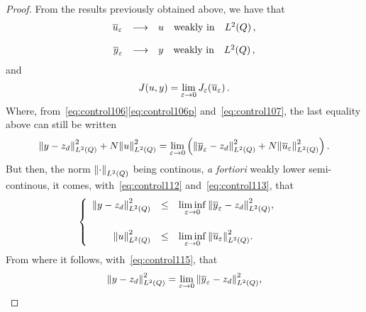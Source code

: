 \begin{proof}%
    From the results previously obtained above, we have that
    \begin{equation}\label{eq:control112}
        \begin{array}{rclll}
            {\overline{u}}_{\varepsilon} & \longrightarrow & u & \text{weakly in} & L^{2}\!\left({Q}\right),
        \end{array}
    \end{equation}

    \begin{equation}\label{eq:control113}
        \begin{array}{rcllll}
            {\overline{y}}_{\varepsilon} & \longrightarrow & y & \text{weakly in} & L^{2}\!\left({Q}\right),
        \end{array}
    \end{equation}
    and
    \begin{equation*}
        J(u,y) = \lim_{\varepsilon\to 0}J_{\varepsilon}\!\left({{\overline{u}}_{\varepsilon}}\right).
    \end{equation*}
    Where, from~\eqref{eq:control106}\eqref{eq:control106p}
    and~\eqref{eq:control107}, the last equality above can still be written
    \begin{equation}\label{eq:control115}
        \normecq{y - z_{d}} + N\normecq{u} = \lim_{\veps\to 0}\left({%
            \normecq{\bareps{y} - z_{d}} + N\normecq{\bareps{u}}
        }\right).
    \end{equation}
    But then, the norm ${\left\|{\cdot }\right\|}_{L^{2}\left({Q}\right)}$ being continous, \textit{a
    fortiori} weakly lower semi-continous, it comes,
    with~\eqref{eq:control112} and~\eqref{eq:control113}, that
    \begin{equation*}
        \begin{cases}\displaystyle
            \begin{array}{rcll}
                {\left\|{y - z_{d} }\right\|}_{L^{2}\left({Q}\right)}^{2} & \leq & \underset{\varepsilon\to
                0}{\lim\inf}\, {\left\|{{\overline{y}}_{\varepsilon} - z_{d} }\right\|}_{L^{2}\left({Q}\right)}^{2},\\
                \\
                {\left\|{u }\right\|}_{L^{2}\left({Q}\right)}^{2} & \leq & \underset{\varepsilon\to 0}{\lim\inf}\,
                {\left\|{{\overline{u}}_{\varepsilon} }\right\|}_{L^{2}\left({Q}\right)}^{2}.
            \end{array}
        \end{cases}
    \end{equation*}
    From where it follows, with~\eqref{eq:control115}, that
    \begin{equation}\label{eq:control118}
        \normecq{y -z_{d}} = \lim_{\veps\to 0}\normecq{\bareps{y} - z_{d}},

\end{equation}
\end{proof}
